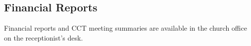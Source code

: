 \vspace{\fill}

\subsection{Financial Reports}
\label{timeofresponse}

Financial reports and CCT meeting summaries are available in the church office on the receptionist's desk.

\vspace{\fill}